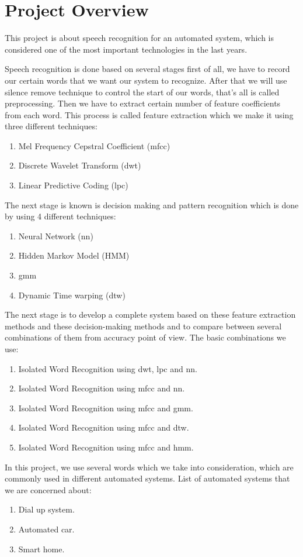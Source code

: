 \documentclass[12pt, a4paper, twoside]{report}
\begin{document}
\section{Project Overview}
This project is about speech recognition for an automated system, which is considered one of the most important technologies in the last years.
\par
Speech recognition is done based on several stages first of all, we have to record our certain words that we want our system to recognize. After that we will use silence remove technique to control the start of our words, that's all is called preprocessing. Then we have to extract certain number of feature coefficients from each word. This process is called feature extraction which we make it using three different techniques:
\begin{enumerate}
\item Mel Frequency Cepstral Coefficient (\acrshort{mfcc})
\item Discrete Wavelet Transform (\acrshort{dwt})
\item Linear Predictive Coding (\acrshort{lpc})
\end{enumerate}
The next stage is known is decision making and pattern recognition which is done by using 4 different techniques:
\begin{enumerate}
\item Neural Network (\acrshort{nn})
\item Hidden Markov Model (HMM)
\item \acrfull{gmm}
\item Dynamic Time warping (\acrshort{dtw})
\end{enumerate}
The next stage is to develop a complete system based on these feature extraction methods and these decision-making methods and to compare between several combinations of them from accuracy point of view. The basic combinations we use:
\begin{enumerate}
\item Isolated Word Recognition using \acrshort{dwt}, \acrshort{lpc} and \acrlong{nn}.
\item Isolated Word Recognition using \acrshort{mfcc} and \acrlong{nn}.
\item Isolated Word Recognition using \acrshort{mfcc} and \acrshort{gmm}.
\item Isolated Word Recognition using \acrshort{mfcc} and \acrshort{dtw}.
\item Isolated Word Recognition using \acrshort{mfcc} and \acrshort{hmm}.
\end{enumerate}
In this project, we use several words which we take into consideration, which are commonly used in different automated systems.
List of automated systems that we are concerned about:
\begin{enumerate}
\item Dial up system.
\item Automated car.
\item Smart home.
\end{enumerate}
\end{document}
